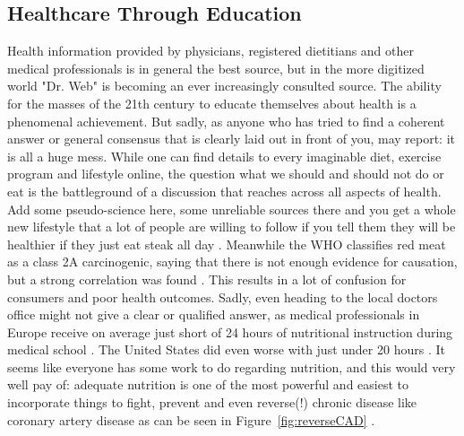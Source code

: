 \subsection{Healthcare Through Education}
Health information provided by physicians, registered dietitians and other medical professionals is in general the best source, but in the more digitized world "Dr. Web" is becoming an ever increasingly consulted source. The ability for the masses of the 21th century to educate themselves about health is a phenomenal achievement. But sadly, as anyone who has tried to find a coherent answer or general consensus that is clearly laid out in front of you, may report: it is all a huge mess. While one can find details to every imaginable diet, exercise program and lifestyle online, the question what we should and should not do or eat is the battleground of a discussion that reaches across all aspects of health. Add some pseudo-science here, some unreliable sources there and you get a whole new lifestyle that a lot of people are willing to follow if you tell them they will be healthier if they just eat steak all day \cite{carnivoreDiet}. Meanwhile the WHO classifies red meat as a class 2A carcinogenic, saying that there is not enough evidence for causation, but a strong correlation was found \cite{whoRedMeat}. This results in a lot of confusion for consumers and poor health outcomes. Sadly, even heading to the local doctors office might not give a clear or qualified answer, as medical professionals in Europe receive on average just short of 24 hours of nutritional instruction during medical school \cite{chung2014nutrition}. The United States did even worse with just under 20 hours \cite{adams2010nutrition}. It seems like everyone has some work to do regarding nutrition, and this would very well pay of: adequate nutrition is one of the most powerful and easiest to incorporate things to fight, prevent and even reverse(!) chronic disease like coronary artery disease as can be seen in Figure~\ref{fig:reverseCAD} \cite{esselstyn2014way}.
